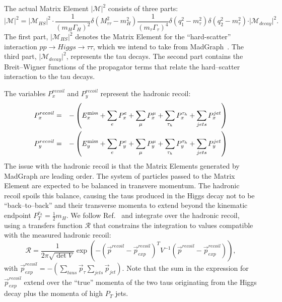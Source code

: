 The actual Matrix Element $\vert \mathcal{M} \vert^2$ consists of three parts:
\begin{equation*}
\vert \mathcal{M} \vert^2 = \vert \mathcal{M}_{HS} \vert^2 \cdot \frac{1}{(m_{H}\Gamma_{H})^{2}} \delta(M_{\tau\tau}^2 - m_{H}^2) 
\frac{1}{(m_{\tau}\Gamma_{\tau})^{4}} \delta(q_{1}^2 - m_{\tau}^2) \delta(q_{2}^2 - m_{\tau}^2) \cdot \vert \mathcal{M}_{decay} \vert^2.
\end{equation*}
The first part, $\vert \mathcal{M}_{HS} \vert^2$ denotes the Matrix Element for the ``hard-scatter'' interaction $pp \rightarrow Higgs \rightarrow \tau\tau$, 
which we intend to take from MadGraph~\cite{MadGraph}.
The third part, $\vert \mathcal{M}_{decay} \vert^2$, represents the tau decays.
The second part contains the Breit--Wigner functions of the propagator terms that relate the hard--scatter interaction to the tau decays.

The variables $P_{x}^{recoil}$ and $P_{y}^{recoil}$ represent the hadronic recoil:
\begin{eqnarray*}
P_{x}^{recoil} & = & -\left(E^{\mathrm{miss}}_{x} + \sum_{e} P_{x}^{e} + \sum_{\mu} P_{x}^{\mu} + \sum_{\tau_{h}} P_{x}^{\tau_{h}} + \sum_{jets} P_{x}^{jet} \right) \\
P_{y}^{recoil} & = & -\left(E^{\mathrm{miss}}_{y} + \sum_{e} P_{y}^{e} + \sum_{\mu} P_{y}^{\mu} + \sum_{\tau_{h}} P_{y}^{\tau_{h}} + \sum_{jets} P_{y}^{jet} \right) 
\end{eqnarray*}
The issue with the hadronic recoil is that the Matrix Elements generated by MadGraph are leading order.
The system of particles passed to the Matrix Element are expected to be balanced in transvere momentum.
The hadronic recoil spoils this balance, causing the taus produced in the Higgs decay not to be ``back--to--back'' 
and their transverse momenta to extend beyond the kinematic endpoint $P_{T}^{\tau_{h}} = \frac{1}{2} m_{H}$.
We follow Ref.~\cite{Alwall:2010cq} and integrate over the hadronic recoil, using a transfers function $\mathcal{R}$ that constrains the
integration to values compatible with the measured hadronic recoil:
\begin{equation*}
\mathcal{R} = \frac{1}{2\pi \sqrt{\det V}} \exp \left( - \left( \vec{p}^{recoil} - \vec{p}_{exp}^{recoil} \right)^{T} V^{-1} \left( \vec{p}^{recoil} - \vec{p}_{exp}^{recoil} \right) \right),
\end{equation*}
with $\vec{p}_{exp}^{recoil} = -\left( \sum_{taus} \vec{p}_{\tau} \sum_{jets} \vec{p}_{jet} \right)$.
Note that the sum in the expression for $\vec{p}_{exp}^{recoil}$ extend over the ``true'' momenta of the two taus originating from the Higgs decay plus the momenta of high $P_{T}$ jets.


